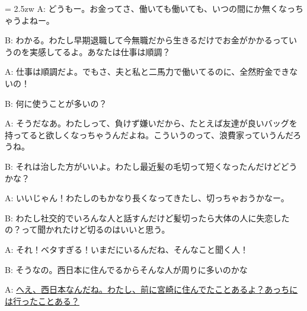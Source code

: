 \documentclass[11pt]{amsart}
\title{}
\author{}
\newenvironment{hangall}[1]{\hangindent = 2.5zw\everypar{\hangindent = 2.5zw}}{}
\begin{document}
\maketitle
\begin{hangall}{}%
A: どうもー。お金ってさ、働いても働いても、いつの間にか無くなっちゃうよねー。

B: わかる。わたし早期退職して今無職だから生きるだけでお金がかかるっていうのを実感してるよ。あなたは仕事は順調？

A: 仕事は順調だよ。でもさ、夫と私と二馬力で働いてるのに、全然貯金できないの！

B: 何に使うことが多いの？

A: そうだなあ。わたしって、負けず嫌いだから、たとえば友達が良いバッグを持ってると欲しくなっちゃうんだよね。こういうのって、浪費家っていうんだろうね。

B: それは治した方がいいよ。わたし最近髪の毛切って短くなったんだけどどうかな？

A: いいじゃん！わたしのもかなり長くなってきたし、切っちゃおうかなー。

B: わたし社交的でいろんな人と話すんだけど髪切ったら大体の人に失恋したの？って聞かれたけど切るのはいいと思う。

A: それ！ベタすぎる！いまだにいるんだね、そんなこと聞く人！

B: そうなの。西日本に住んでるからそんな人が周りに多いのかな

A: \ul{へえ、西日本なんだね。わたし、前に宮崎に住んでたことあるよ？あっちには行ったことある？}\end{hangall}
\end{document}
